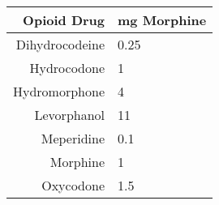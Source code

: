 \begin{tabular}{r|l}
\hline\hline
Opioid Drug & mg Morphine \\
\hline
Dihydrocodeine & 0.25\\
Hydrocodone & 1 \\
Hydromorphone & 4 \\
Levorphanol & 11 \\
Meperidine & 0.1 \\
Morphine & 1 \\
Oxycodone & 1.5 \\
\hline\hline
\end{tabular}
